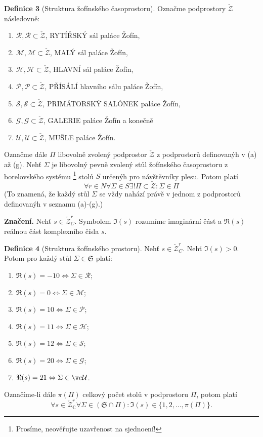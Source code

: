 \documentclass[12pt,a4paper]{article}
\begin{document}
\textbf{Definice 3}
(Struktura žofínského časoprostoru).
Označme podprostory $\check{\mathcal{Z}}$ následovně:
\begin{enumerate}
\itemsep0em 
\item $\mathcal{R}, \mathcal{R} \subset \check{\mathcal{Z}}$, RYTÍŘSKÝ sál paláce Žofín,
\item $\mathcal{M}, \mathcal{M} \subset \check{\mathcal{Z}}$, MALÝ sál paláce Žofín,
\item $\mathcal{H}, \mathcal{H} \subset \check{\mathcal{Z}}$, HLAVNÍ sál paláce Žofín,
\item $\mathcal{P}, \mathcal{P} \subset \check{\mathcal{Z}}$, PŘÍSÁLÍ hlavního sálu paláce Žofín,
\item $\mathcal{S}, \mathcal{S} \subset \check{\mathcal{Z}}$, PRIMÁTORSKÝ SALÓNEK paláce Žofín,
\item $\mathcal{G}, \mathcal{G} \subset \check{\mathcal{Z}}$, GALERIE paláce Žofín a konečně
\item $\mathcal{U}, \mathcal{U} \subset \check{\mathcal{Z}}$, MUŠLE paláce Žofín.
\end{enumerate}
Označme dále $\Pi$ libovolně zvolený podprostor $\check{\mathcal{Z}}$
z podprostorů definovanýh v (a) až (g).
Nehť $\Sigma$ je libovolný pevně zvolený stůl žofínského časoprostoru z borelovského systému \footnote{Prosíme, neověřujte uzavřenost na sjednoení!}
stolů $S$ určenýh pro návštěvníky plesu. Potom platí
$$
\forall r \in N \forall \Sigma \in S \exists ! \Pi \subset \check{\mathcal{Z}} : \Sigma \in \Pi
$$
(To znamená, že každý stůl $\Sigma$ se vždy nahází právě v jednom z podprostorů definovanýh
v seznamu (a)-(g).)


\textbf{Značení.}
Nehť $s \in \check{\mathcal{Z}}^r_C$. Symbolem $\Im(s)$ rozumíme imaginární část a $\Re(s)$ reálnou část
komplexního čísla $s$.


\textbf{Definice 4}
(Struktura žofínského prostoru).
Nehť $s \in \check{\mathcal{Z}}^r_C$. Nehť $\Im(s) > 0$. Potom pro
každý stůl $\Sigma \in \mathfrak{S}$ platí:
\begin{enumerate}
\itemsep0em 
\item $\Re(s) = -10 \Leftrightarrow \Sigma \in \mathcal{R}$;
\item $\Re(s) = 0 \Leftrightarrow \Sigma \in \mathcal{M}$;
\item $\Re(s) = 10 \Leftrightarrow \Sigma \in \mathcal{P}$;
\item $\Re(s) = 11 \Leftrightarrow \Sigma \in \mathcal{H}$;
\item $\Re(s) = 12 \Leftrightarrow \Sigma \in \mathcal{S}$;
\item $\Re(s) = 20 \Leftrightarrow \Sigma \in \mathcal{G}$;
\item $\Re(s) = 21 \Leftrightarrow \Sigma \ině \mathcal{U}$.
\end{enumerate}
Označíme-li dále $\pi(\Pi)$ celkový počet stolů v podprostoru $\Pi$, potom platí
$$
\forall s \in \check{\mathcal{Z}}^r_{\mathds{C}} \forall \Sigma \in (\mathfrak{S} \cap \Pi) : \Im(s) \in \{1, 2, ..., \pi(\Pi)\}.
$$
\end{document}
